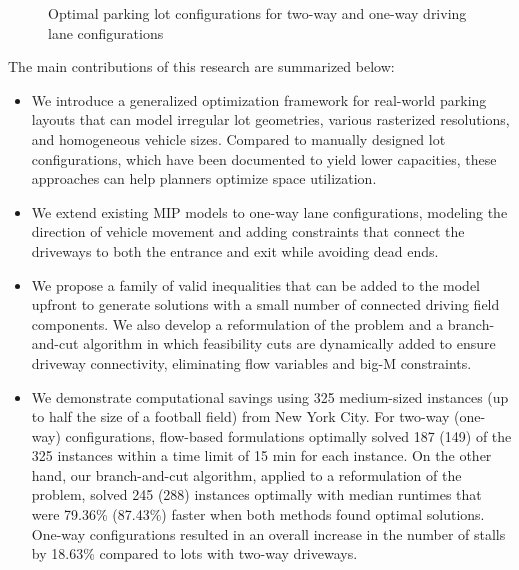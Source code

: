 \documentclass[10pt]{article}
\theoremstyle{definition}
\begin{document}
\begin{figure}[H]
\begin{minipage}{0.24\textwidth}
\end{minipage}
\caption{Optimal parking lot configurations for two-way and one-way driving lane configurations}
\label{fig:introduction_example}
\end{figure}

The main contributions of this research are summarized below:

\begin{itemize}
\itemsep 0pt
\item We introduce a generalized optimization framework for real-world parking layouts that can model irregular lot geometries, various rasterized resolutions, and homogeneous vehicle sizes. Compared to manually designed lot configurations, which have been documented to yield lower capacities, these approaches can help planners optimize space utilization.
\item We extend existing MIP models to one-way lane configurations, modeling the direction of vehicle movement and adding constraints that connect the driveways to both the entrance and exit while avoiding dead ends.
\item We propose a family of valid inequalities that can be added to the model upfront to generate solutions with a small number of connected driving field components. We also develop a reformulation of the problem and a branch-and-cut algorithm in which feasibility cuts are dynamically added to ensure driveway connectivity, eliminating flow variables and big-M constraints.
\item We demonstrate computational savings using 325 medium-sized instances (up to half the size of a football field) from New York City. For two-way (one-way) configurations, flow-based formulations optimally solved 187 (149) of the 325 instances within a time limit of 15 min for each instance. On the other hand, our branch-and-cut algorithm, applied to a reformulation of the problem, solved 245 (288) instances optimally with median runtimes that were 79.36\% (87.43\%) faster when both methods found optimal solutions. One-way configurations resulted in an overall increase in the number of stalls by 18.63\% compared to lots with two-way driveways. 
\end{itemize}
\end{document}
